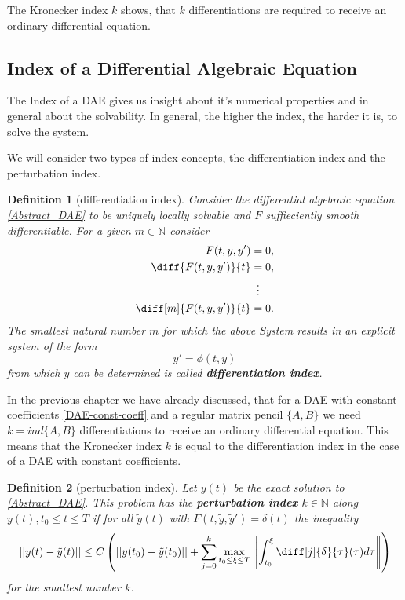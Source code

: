 \documentclass[11pt,titlepage]{article}
\newtheorem{definition}{Definition}
\begin{document}
				The Kronecker index $k$ shows, that $k$ differentiations are required to receive an ordinary differential equation.
		\subsection{Index of a Differential Algebraic Equation}
		
			The Index of a DAE gives us insight about it's numerical properties and in general about the solvability. In general, the higher the index, the harder it is, to solve the system. 
			
			We will consider two types of index concepts, the differentiation index and the perturbation index.
					
			\begin{definition}[differentiation index]
				Consider the differential algebraic equation \ref{Abstract_DAE} to be uniquely locally solvable and $F$ suffieciently smooth differentiable. For a given $m \in \mathbb{N}$ consider
				\begin{displaymath}
					\begin{aligned}
						F(t,y,y') &= 0, \\
						\diff{F(t,y,y')}{t} &= 0, \\
						&\vdotswithin{=} \\
						\diff[m]{F(t,y,y')}{t} &= 0.
					\end{aligned}
				\end{displaymath}
				The smallest natural number $m$ for which the above System results in an explicit system of the form
				\begin{displaymath}
					y' = \phi(t,y)
				\end{displaymath}
				from which $y$ can be determined is called \textbf{differentiation index}.
			\end{definition}
			
			In the previous chapter we have already discussed, that for a DAE with constant coefficients \ref{DAE-const-coeff} and a regular matrix pencil $\{A,B\}$  we need $k = ind\{A,B\}$ differentiations to receive an ordinary differential equation. This means that the Kronecker index $k$ is equal to the differentiation index in the case of a DAE with constant coefficients.
			
			\begin{definition}[perturbation index]
				Let $y(t)$ be the exact solution to \ref{Abstract_DAE}. This problem has the \textbf{perturbation index} $k \in \mathbb{N}$ along $y(t), t_0 \leq t \leq T$ if for all  $\tilde{y}(t)$ with $F(t, \tilde{y}, \tilde{y}') = \delta(t)$ the inequality
				\begin{displaymath}
					||y(t)-\tilde{y}(t)|| \leq C \left(||y(t_0)-\tilde{y}(t_0)||+\sum_{j=0}^{k}\max_{t_0 \leq \xi \leq T} \left\rVert 		\int_{t_0}^{\xi}\diff[j]{\delta}{\tau}(\tau)d \tau \right\rVert \right)
				\end{displaymath}
				for the smallest number $k$.
			\end{definition}	
	
\end{document}
